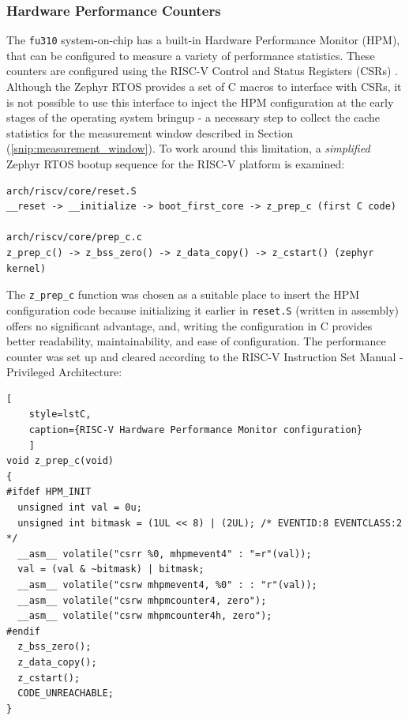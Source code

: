 \subsubsection{Hardware Performance Counters}
The \texttt{fu310} system-on-chip has a built-in Hardware Performance Monitor (HPM), that can be configured to measure a variety of performance statistics. These counters are configured
using the RISC-V Control and Status Registers (CSRs) \cite{fe310docs, riscvisa}.
Although the Zephyr RTOS provides a set of C macros to interface with CSRs, it is not possible to use this interface to inject the HPM configuration at the early stages of the
operating system bringup - a necessary step to collect the cache statistics for the measurement window described in Section (\ref{snip:measurement_window}). To work around this limitation,
a \textit{simplified} Zephyr RTOS bootup sequence for the RISC-V platform is examined:

\begin{verbatim}
arch/riscv/core/reset.S
__reset -> __initialize -> boot_first_core -> z_prep_c (first C code)

arch/riscv/core/prep_c.c
z_prep_c() -> z_bss_zero() -> z_data_copy() -> z_cstart() (zephyr kernel)
\end{verbatim}

\noindent The \texttt{z\_prep\_c} function was chosen as a suitable place to insert the HPM configuration code because initializing it earlier in \texttt{reset.S} (written in
assembly) offers no significant advantage, and,  writing the configuration in C provides better readability, maintainability, and ease of configuration. The performance counter
was set up and cleared according to the RISC-V Instruction Set Manual - Privileged Architecture:

\begin{center}
\centering
\begin{minipage}{\linewidth}
\begin{lstlisting}[
	style=lstC,
    caption={RISC-V Hardware Performance Monitor configuration}
    ]
void z_prep_c(void)
{
#ifdef HPM_INIT
  unsigned int val = 0u;
  unsigned int bitmask = (1UL << 8) | (2UL); /* EVENTID:8 EVENTCLASS:2 */
  __asm__ volatile("csrr %0, mhpmevent4" : "=r"(val));
  val = (val & ~bitmask) | bitmask;
  __asm__ volatile("csrw mhpmevent4, %0" : : "r"(val));
  __asm__ volatile("csrw mhpmcounter4, zero");
  __asm__ volatile("csrw mhpmcounter4h, zero");
#endif
  z_bss_zero();
  z_data_copy();
  z_cstart();
  CODE_UNREACHABLE;
}
\end{lstlisting}
\end{minipage}
\end{center}

